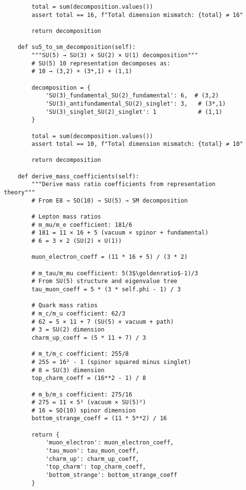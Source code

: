 \documentclass[11pt]{article}
\theoremstyle{definition}
\newcommand{\goldenratio}{\phi}
\begin{document}
\begin{verbatim}
        total = sum(decomposition.values())
        assert total == 16, f"Total dimension mismatch: {total} ≠ 16"
        
        return decomposition
    
    def su5_to_sm_decomposition(self):
        """SU(5) → SU(3) × SU(2) × U(1) decomposition"""
        # SU(5) 10 representation decomposes as:
        # 10 → (3,2) + (3*,1) + (1,1)
        
        decomposition = {
            'SU(3)_fundamental_SU(2)_fundamental': 6,  # (3,2)
            'SU(3)_antifundamental_SU(2)_singlet': 3,   # (3*,1)
            'SU(3)_singlet_SU(2)_singlet': 1            # (1,1)
        }
        
        total = sum(decomposition.values())
        assert total == 10, f"Total dimension mismatch: {total} ≠ 10"
        
        return decomposition
    
    def derive_mass_coefficients(self):
        """Derive mass ratio coefficients from representation theory"""
        # From E8 → SO(10) → SU(5) → SM decomposition
        
        # Lepton mass ratios
        # m_mu/m_e coefficient: 181/6
        # 181 = 11 × 16 + 5 (vacuum × spinor + fundamental)
        # 6 = 3 × 2 (SU(2) × U(1))
        
        muon_electron_coeff = (11 * 16 + 5) / (3 * 2)
        
        # m_tau/m_mu coefficient: 5(3$\goldenratio$-1)/3
        # From SU(5) structure and eigenvalue tree
        tau_muon_coeff = 5 * (3 * self.phi - 1) / 3
        
        # Quark mass ratios
        # m_c/m_u coefficient: 62/3
        # 62 = 5 × 11 + 7 (SU(5) × vacuum + path)
        # 3 = SU(2) dimension
        charm_up_coeff = (5 * 11 + 7) / 3
        
        # m_t/m_c coefficient: 255/8
        # 255 = 16² - 1 (spinor squared minus singlet)
        # 8 = SU(3) dimension
        top_charm_coeff = (16**2 - 1) / 8
        
        # m_b/m_s coefficient: 275/16
        # 275 = 11 × 5² (vacuum × SU(5)²)
        # 16 = SO(10) spinor dimension
        bottom_strange_coeff = (11 * 5**2) / 16
        
        return {
            'muon_electron': muon_electron_coeff,
            'tau_muon': tau_muon_coeff,
            'charm_up': charm_up_coeff,
            'top_charm': top_charm_coeff,
            'bottom_strange': bottom_strange_coeff
        }
    

\end{verbatim}
\end{document}
